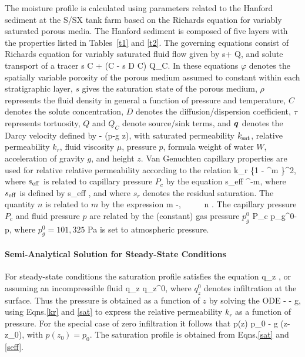 The moisture profile is calculated using parameters related to the Hanford sediment at the S/SX tank farm based on the Richards equation for variably saturated porous media. The Hanford sediment is composed of five layers with the properties listed in Tables~\ref{t1} and \ref{t2}. The governing equations consist of Richards equation for variably saturated fluid flow given by
\EQ
{} \varphi s\rho + \bnabla\cdot\bq\rho \eq Q,
\EN
and solute transport of a tracer
\EQ
{}\varphi s C + \bnabla\cdot\big(\bq C - \varphi s \tau D \bnabla C\big) \eq Q_C.
\EN
In these equations $\varphi$ denotes the spatially variable porosity of the porous medium assumed to constant within each stratigraphic layer, $s$ gives the saturation state of the porous medium, $\rho$ represents the fluid density in general a function of pressure and temperature, $C$ denotes the solute concentration, $D$ denotes the diffusion/dispersion coefficient, $\tau$ represents tortuosity, $Q$ and $Q_C$ denote source/sink terms, and $\boldsymbol{q}$ denotes the Darcy velocity defined by
\EQ
\bq\eq -  \bnabla (p-\rho g z),
\EN
with saturated permeability $k_{\rm sat}$, relative permeability $k_r$, fluid viscosity $\mu$, pressure $p$, formula weight of water $W$, acceleration of gravity $g$, and height $z$. Van Genuchten capillary properties are used for relative relative permeability according to the relation
\EQ\label{kr}
k_{r} \eq {} \left\{1 - ^m \right\}^2, 
\EN
where $s_{\rm eff}$ is related to capillary pressure $P_c$ by the equation
\EQ\label{sat}
s_{\rm eff} \eq {}^{-m}, 
\EN 
where $s_{\rm 
eff}$ is defined by 
\EQ\label{seff1}
s_{\rm eff} \eq {}, 
\EN 
and where $s_r$ denotes the residual saturation. The quantity $n$ is related to $m$ by the expression 
\EQ\label{lambda} 
m -, \ \ \ \ \ n \eq {}. 
\EN 
The capillary pressure $P_c$ and fluid pressure $p$ are related by the (constant) gas pressure $p_g^0$
\EQ
P_c \eq p_g^0-p,
\EN
where $p_g^0 \!=\! 101,325$ Pa is set to atmospheric pressure.

\paragraph{Semi-Analytical Solution for Steady-State Conditions}

For steady-state conditions the saturation profile satisfies the equation
\EQ
{} \rho q_z ,
\EN
or assuming an incompressible fluid
\EQ
q_z \eq q_z^0,
\EN
where $q_z^0$ denotes infiltration at the surface. Thus the pressure is obtained as a function of $z$ by solving the ODE
\EQ\label{dpdz}
 \eq - - \rho g,
\EN
using Eqns.\eqref{kr} and \eqref{sat} to express the relative permeability $k_r$ as a function of pressure. For the special case of zero infiltration it follows that
\EQ
p(z) \eq p_0 - \rho g (z-z_0),
\EN
with $p(z_0)\!=\!p_0$. The saturation profile is obtained from Eqns.\eqref{sat} and \eqref{seff}.

